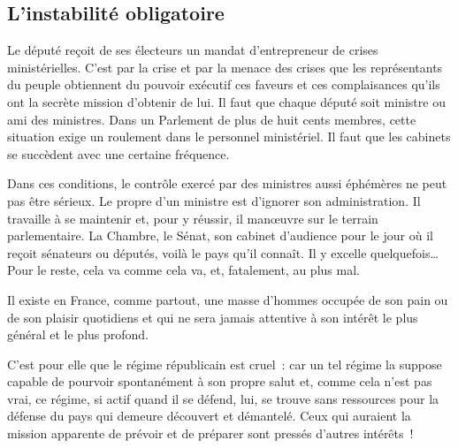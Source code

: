 \documentclass[french,twoside]{book} %
\newcommand{\astermono}{\medskip\centerline{\color{rubric}\large\selectfont{\syms ✻}}\medskip\par}%
\begin{document}
\subsection[L’instabilité obligatoire]{L’instabilité obligatoire}
\noindent Le député reçoit de ses électeurs un mandat d’entrepreneur de crises ministérielles. C’est par la crise et par la menace des crises que les représentants du peuple obtiennent du pouvoir exécutif ces faveurs et ces complaisances qu’ils ont la secrète mission d’obtenir de lui. Il faut que chaque député soit ministre ou ami des ministres. Dans un Parlement de plus de huit cents membres, cette situation exige un roulement dans le personnel ministériel. Il faut que les cabinets se succèdent avec une certaine fréquence.\par
Dans ces conditions, le contrôle exercé par des ministres aussi éphémères ne peut pas être sérieux. Le propre d’un ministre est d’ignorer son administration. Il travaille à se maintenir et, pour y réussir, il manœuvre sur le terrain parlementaire. La Chambre, le Sénat, son cabinet d’audience pour le jour où il reçoit sénateurs ou députés, voilà le pays qu’il connaît. Il y excelle quelquefois… Pour le reste, cela va comme cela va, et, fatalement, au plus mal.\par
Il existe en France, comme partout, une masse d’hommes occupée de son pain ou de son plaisir quotidiens et qui ne sera jamais attentive à son intérêt le plus général et le plus profond.\par
C’est pour elle que le régime républicain est cruel : car un tel régime la suppose capable de pourvoir spontanément à son propre salut et, comme cela n’est pas vrai, ce régime, si actif quand il se défend, lui, se trouve sans ressources pour la défense du pays qui demeure découvert et démantelé. Ceux qui auraient la mission apparente de prévoir et de préparer sont pressés d’autres intérêts !\par

\astermono
\end{document}
